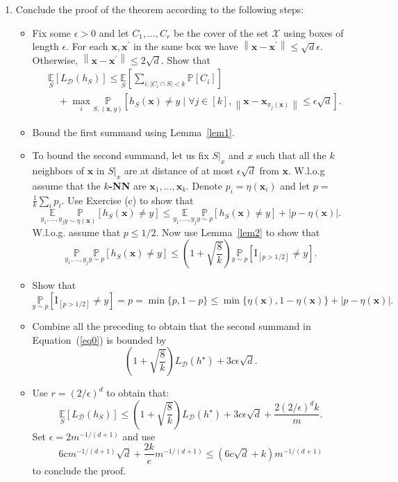\documentclass[12pt,letterpaper]{article}
\theoremstyle{definition}
\begin{document}
\begin{enumerate}[label=(\alph*)]
\item Conclude the proof of the theorem according to the following steps:
\begin{itemize}
\item Fix some $\epsilon>0$ and let $C_{1}, \ldots, C_{r}$ be the cover of the set $\mathcal{X}$ using boxes of length $\epsilon$. For each $\bm{x}, \bm{x}^{\prime}$ in the same box we have $\left\|\bm{x}-\bm{x}^{\prime}\right\| \leq \sqrt{d} \epsilon$. Otherwise, $\left\|\bm{x}-\bm{x}^{\prime}\right\| \leq 2 \sqrt{d}$. Show that
\begin{align}
&\underset{S}{\mathbb{E}}\left[L_{\mathcal{D}}\left(h_{S}\right)\right] \leq \underset{S}{\mathbb{E}}\left[\sum_{i:\left|C_{i} \cap S\right|<k} \mathbb{P}\left[C_{i}\right]\right] \nonumber \\
&\quad+\max _{i} \underset{S,(\bm{x}, y)}{\mathbb{P}}\left[h_{S}(\bm{x}) \neq y \mid \forall j \in[k],\left\|\bm{x}-\bm{x}_{\pi_{j}(\bm{x})}\right\| \leq \epsilon \sqrt{d}\right] .\label{eq0}
\end{align}

    \item Bound the first summand using Lemma~\ref{lem1}.
    \item To bound the second summand, let us fix $\left.S\right|_{x}$ and $x$ such that all the $k$ neighbors of $\bm{x}$ in $\left.S\right|_{x}$ are at distance of at most $\epsilon \sqrt{d}$ from $\bm{x}$. W.l.o.g assume that the {\bf $k$-NN} are $\bm{x}_{1}, \ldots, \bm{x}_{k}$. Denote $p_{i}=\eta\left(\bm{x}_{i}\right)$ and let $p=$ $\frac{1}{k} \sum_{i} p_{i}$. Use Exercise (c) to show that
$$
\underset{y_{1}, \ldots, y_{j}}{\mathbb{E}} \underset{y \sim \eta(\bm{x})}{\mathbb{P}}\left[h_{S}(\bm{x}) \neq y\right] \leq \underset{y_{1}, \ldots, y_{j}}{\mathbb{E}} \underset{y \sim p}{\mathbb{P}}\left[h_{S}(\bm{x}) \neq y\right]+|p-\eta(\bm{x})| .
$$
W.l.o.g. assume that $p \leq 1 / 2$. Now use Lemma~\ref{lem2} to show that
$$
\underset{y_{1}, \ldots, y_{j}}{\mathbb{P}} \underset{y \sim p}{\mathbb{P}}\left[h_{S}(\bm{x}) \neq y\right] \leq\left(1+\sqrt{\frac{8}{k}}\right) \underset{y \sim p}{\mathbb{P}}\left[\mathrm{I}_{[p>1 / 2]} \neq y\right] .
$$

    \item Show that
$$
\underset{y \sim p}{\mathbb{P}}\left[\mathrm{I}_{[p>1 / 2]} \neq y\right]=p=\min \{p, 1-p \} \leq \min \{\eta(\bm{x}), 1-\eta(\bm{x})\}+|p-\eta(\bm{x})|.
$$
    \item Combine all the preceding to obtain that the second summand in Equation~(\ref{eq0}) is bounded by
$$
\left(1+\sqrt{\frac{8}{k}}\right) L_{\mathcal{D}}\left(h^{\star}\right)+3 c \epsilon \sqrt{d} .
$$
        \item Use $r=(2 / \epsilon)^{d}$ to obtain that:
$$
\underset{S}{\mathbb{E}}\left[L_{\mathcal{D}}\left(h_{S}\right)\right] \leq\left(1+\sqrt{\frac{8}{k}}\right) L_{\mathcal{D}}\left(h^{\star}\right)+3 c \epsilon \sqrt{d}+\frac{2(2 / \epsilon)^{d} k}{m} .
$$
Set $\epsilon=2 m^{-1 /(d+1)}$ and use
$$
6 c m^{-1 /(d+1)} \sqrt{d}+\frac{2 k}{e} m^{-1 /(d+1)} \leq(6 c \sqrt{d}+k) m^{-1 /(d+1)}
$$
to conclude the proof.


\end{itemize}
\end{enumerate}
\end{document}
